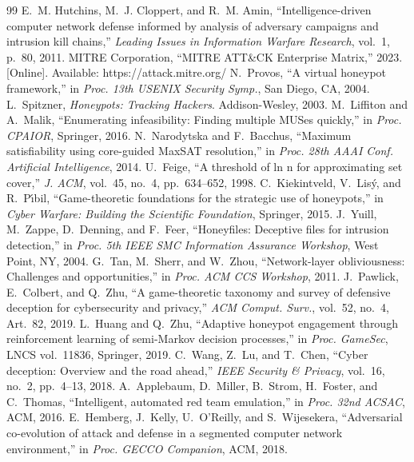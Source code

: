 \documentclass[10pt,twocolumn]{article}
\begin{document}
\balance
\begin{thebibliography}{99}\small
{} E.~M. Hutchins, M.~J. Cloppert, and R.~M. Amin, ``Intelligence-driven computer network defense informed by analysis of adversary campaigns and intrusion kill chains,'' \textit{Leading Issues in Information Warfare Research}, vol.~1, p.~80, 2011.
 MITRE Corporation, ``MITRE ATT\&CK Enterprise Matrix,'' 2023. [Online]. Available: https://attack.mitre.org/
 N.~Provos, ``A virtual honeypot framework,'' in \textit{Proc. 13th USENIX Security Symp.}, San Diego, CA, 2004.
 L.~Spitzner, \textit{Honeypots: Tracking Hackers}. Addison-Wesley, 2003.
 M.~Liffiton and A.~Malik, ``Enumerating infeasibility: Finding multiple MUSes quickly,'' in \textit{Proc. CPAIOR}, Springer, 2016.
 N.~Narodytska and F.~Bacchus, ``Maximum satisfiability using core-guided MaxSAT resolution,'' in \textit{Proc. 28th AAAI Conf. Artificial Intelligence}, 2014.
 U.~Feige, ``A threshold of ln n for approximating set cover,'' \textit{J. ACM}, vol.~45, no.~4, pp.~634--652, 1998.
 C.~Kiekintveld, V.~Lis\'y, and R.~P\'\i bil, ``Game-theoretic foundations for the strategic use of honeypots,'' in \textit{Cyber Warfare: Building the Scientific Foundation}, Springer, 2015.
 J.~Yuill, M.~Zappe, D.~Denning, and F.~Feer, ``Honeyfiles: Deceptive files for intrusion detection,'' in \textit{Proc. 5th IEEE SMC Information Assurance Workshop}, West Point, NY, 2004.
 G.~Tan, M.~Sherr, and W.~Zhou, ``Network-layer obliviousness: Challenges and opportunities,'' in \textit{Proc. ACM CCS Workshop}, 2011.
 J.~Pawlick, E.~Colbert, and Q.~Zhu, ``A game-theoretic taxonomy and survey of defensive deception for cybersecurity and privacy,'' \textit{ACM Comput. Surv.}, vol.~52, no.~4, Art.~82, 2019.
 L.~Huang and Q.~Zhu, ``Adaptive honeypot engagement through reinforcement learning of semi-Markov decision processes,'' in \textit{Proc. GameSec}, LNCS vol.~11836, Springer, 2019.
 C.~Wang, Z.~Lu, and T.~Chen, ``Cyber deception: Overview and the road ahead,'' \textit{IEEE Security \& Privacy}, vol.~16, no.~2, pp.~4--13, 2018.
 A.~Applebaum, D.~Miller, B.~Strom, H.~Foster, and C.~Thomas, ``Intelligent, automated red team emulation,'' in \textit{Proc. 32nd ACSAC}, ACM, 2016.
 E.~Hemberg, J.~Kelly, U.~O'Reilly, and S.~Wijesekera, ``Adversarial co-evolution of attack and defense in a segmented computer network environment,'' in \textit{Proc. GECCO Companion}, ACM, 2018.

\end{thebibliography}
\end{document}
